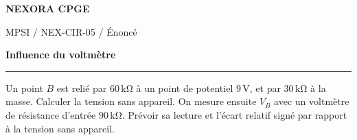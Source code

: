 \documentclass[11pt,a4paper]{article}
\begin{document}
{\small\bfseries\color{nexorablue} NEXORA CPGE}\par
{\small MPSI / NEX-CIR-05 / Énoncé}\par
{\LARGE\bfseries Influence du voltmètre}\par
\vspace{0.25em}\hrule\vspace{0.6em}

Un point $B$ est relié par $60\,\mathrm{k\Omega}$ à un point de potentiel $9\,\mathrm V$, et par $30\,\mathrm{k\Omega}$ à la masse. Calculer la tension sans appareil. On mesure ensuite $V_B$ avec un voltmètre de résistance d’entrée $90\,\mathrm{k\Omega}$. Prévoir sa lecture et l’écart relatif signé par rapport à la tension sans appareil.
\end{document}

